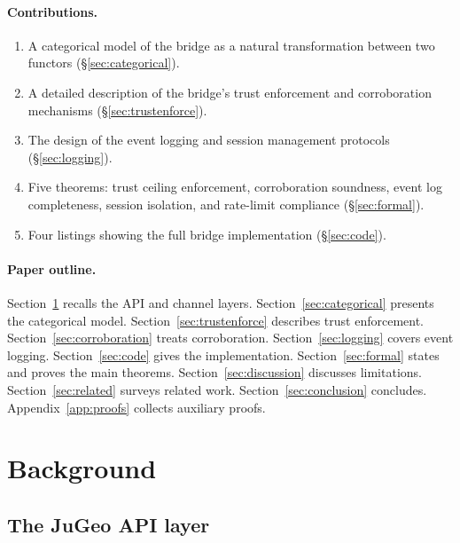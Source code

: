 \documentclass[11pt]{article}
\begin{document}
\paragraph{Contributions.}
\begin{enumerate}
\item A categorical model of the bridge as a natural
      transformation between two functors
      (\S\ref{sec:categorical}).
\item A detailed description of the bridge's trust
      enforcement and corroboration mechanisms
      (\S\ref{sec:trustenforce}).
\item The design of the event logging and session management
      protocols (\S\ref{sec:logging}).
\item Five theorems: trust ceiling enforcement, corroboration
      soundness, event log completeness, session isolation,
      and rate-limit compliance (\S\ref{sec:formal}).
\item Four \Python{} listings showing the full bridge
      implementation (\S\ref{sec:code}).
\end{enumerate}

\paragraph{Paper outline.}
Section~\ref{sec:background} recalls the API and channel layers.
Section~\ref{sec:categorical} presents the categorical model.
Section~\ref{sec:trustenforce} describes trust enforcement.
Section~\ref{sec:corroboration} treats corroboration.
Section~\ref{sec:logging} covers event logging.
Section~\ref{sec:code} gives the implementation.
Section~\ref{sec:formal} states and proves the main theorems.
Section~\ref{sec:discussion} discusses limitations.
Section~\ref{sec:related} surveys related work.
Section~\ref{sec:conclusion} concludes.
Appendix~\ref{app:proofs} collects auxiliary proofs.

\section{Background}\label{sec:background}

\subsection{The JuGeo API layer}
\end{document}
